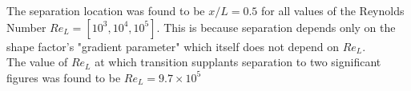 

\vspace{0.2cm}

The separation location was found to be $x/L = 0.5$ for all values of the Reynolds Number $Re_L = [10^3, 10^4, 10^5]$. This is because separation depends only on the shape factor's "gradient parameter" which itself does not depend on $Re_L$.\\[5pt]


The value of $Re_L$ at which transition supplants separation to two significant figures was found to be $Re_L = 9.7\times10^5$
